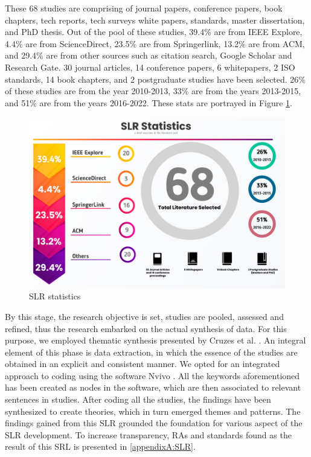 \documentclass{bmcart}
\begin{document}
These 68 studies are comprising of journal papers, conference papers, book chapters, tech reports, tech surveys white papers, standards, master dissertation, and PhD thesis. Out of the pool of these studies, 39.4\% are from IEEE Explore, 4.4\% are from ScienceDirect, 23.5\% are from Springerlink, 13.2\% are from ACM, and 29.4\% are from other sources such as citation search, Google Scholar and Research Gate. 30 journal articles, 14 conference papers, 6 whitepapers, 2 ISO standards, 14 book chapters, and 2 postgraduate studies have been selected. 26\% of these studies are from the year 2010-2013, 33\% are from the years 2013-2015, and 51\% are from the years 2016-2022. These stats are portrayed in Figure \ref{fig:SLRStats}.

\begin{figure}[h!]
    \centering
    \includegraphics[width=12cm]{databases-statitistic.jpg}
    \caption{SLR statistics}
    \label{fig:SLRStats}
\end{figure}


By this stage, the research objective is set, studies are pooled, assessed and refined, thus the research embarked on the actual synthesis of data. For this purpose, we employed thematic synthesis presented by Cruzes et al. \cite{cruzes2011recommended}. An integral element of this phase is data extraction, in which the essence of the studies are obtained in an explicit and consistent manner. We opted for an integrated approach to coding \cite{lofland1971analyzing} using the software Nvivo \cite{nvivo}. All the keywords aforementioned has been created as nodes in the software, which are then associated to relevant sentences in studies. After coding all the studies, the findings have been synthesized to create theories, which in turn emerged themes and patterns. The findings gained from this SLR grounded the foundation for various aspect of the SLR development. To increase transparency, RAs and standards found as the result of this SRL is presented in \ref{appendixA:SLR}. 
   
\end{document}
